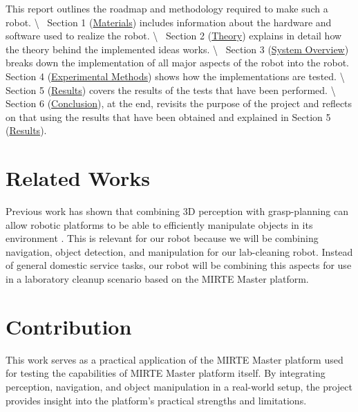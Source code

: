 This report outlines the roadmap and methodology required to make such a robot. {\textbackslash}~
Section 1 (\href{https://matt-rbt.github.io/Lab-Cleanup-Robot-using-the-Mirte-Master-Platform/materials/}{Materials}) includes information about the hardware and software used to realize the robot. {\textbackslash}~
Section 2 (\href{https://matt-rbt.github.io/Lab-Cleanup-Robot-using-the-Mirte-Master-Platform/theory/}{Theory}) explains in detail how the theory behind the implemented ideas works. {\textbackslash}~
Section 3 (\href{https://matt-rbt.github.io/Lab-Cleanup-Robot-using-the-Mirte-Master-Platform/systemoverview/}{System Overview}) breaks down the implementation of all major aspects of the robot into the robot. Section 4 (\href{https://matt-rbt.github.io/Lab-Cleanup-Robot-using-the-Mirte-Master-Platform/methods/}{Experimental Methods}) shows how the implementations are tested. {\textbackslash}~
Section 5 (\href{https://matt-rbt.github.io/Lab-Cleanup-Robot-using-the-Mirte-Master-Platform/results/}{Results}) covers the results of the tests that have been performed. {\textbackslash}~
Section 6 (\href{https://matt-rbt.github.io/Lab-Cleanup-Robot-using-the-Mirte-Master-Platform/conclusion/}{Conclusion}), at the end, revisits the purpose of the project and reflects on that using the results that have been obtained and explained in Section 5 (\href{https://matt-rbt.github.io/Lab-Cleanup-Robot-using-the-Mirte-Master-Platform/results/}{Results}).

\section{Related Works}

Previous work has shown that combining 3D perception with grasp-planning can allow robotic platforms to be able to efficiently manipulate objects in its environment \citep{STUCKLER20131106}. This is relevant for our robot because we will be combining navigation, object detection, and manipulation for our lab-cleaning robot. Instead of general domestic service tasks, our robot will be combining this aspects for use in a laboratory cleanup scenario based on the MIRTE Master platform.

\section{Contribution}

This work serves as a practical application of the MIRTE Master platform used for testing the capabilities of MIRTE Master platform itself. By integrating perception, navigation, and object manipulation in a real-world setup, the project provides insight into the platform's practical strengths and limitations.